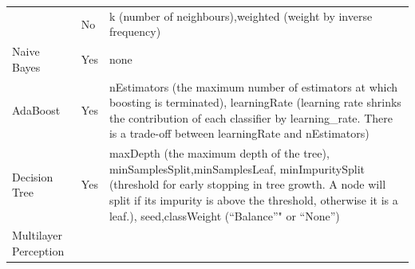 \documentclass[]{article}
\begin{document}
\begin{longtable}[]{@{}lll@{}}
\begin{minipage}[t]{0.35\columnwidth}
\end{minipage} & \begin{minipage}[t]{0.08\columnwidth}\raggedright\strut
No\strut
\end{minipage} & \begin{minipage}[t]{0.48\columnwidth}\raggedright\strut
k (number of neighbours),weighted (weight by inverse frequency)\strut
\end{minipage}\tabularnewline
\begin{minipage}[t]{0.35\columnwidth}\raggedright\strut
Naive Bayes\strut
\end{minipage} & \begin{minipage}[t]{0.08\columnwidth}\raggedright\strut
Yes\strut
\end{minipage} & \begin{minipage}[t]{0.48\columnwidth}\raggedright\strut
none\strut
\end{minipage}\tabularnewline
\begin{minipage}[t]{0.35\columnwidth}\raggedright\strut
AdaBoost\strut
\end{minipage} & \begin{minipage}[t]{0.08\columnwidth}\raggedright\strut
Yes\strut
\end{minipage} & \begin{minipage}[t]{0.48\columnwidth}\raggedright\strut
nEstimators (the maximum number of estimators at which boosting is
terminated), learningRate (learning rate shrinks the contribution of
each classifier by learning\_rate. There is a trade-off between
learningRate and nEstimators)\strut
\end{minipage}\tabularnewline
\begin{minipage}[t]{0.35\columnwidth}\raggedright\strut
Decision Tree\strut
\end{minipage} & \begin{minipage}[t]{0.08\columnwidth}\raggedright\strut
Yes\strut
\end{minipage} & \begin{minipage}[t]{0.48\columnwidth}\raggedright\strut
maxDepth (the maximum depth of the tree),
minSamplesSplit,minSamplesLeaf, minImpuritySplit (threshold for early
stopping in tree growth. A node will split if its impurity is above the
threshold, otherwise it is a leaf.), seed,classWeight (``Balance''" or
``None'')\strut
\end{minipage}\tabularnewline
\begin{minipage}[t]{0.35\columnwidth}\raggedright\strut
Multilayer Perception\strut
\end{minipage} & \begin{minipage}[t]{0.08\columnwidth}\raggedright\strut

\end{minipage}
\end{longtable}
\end{document}
